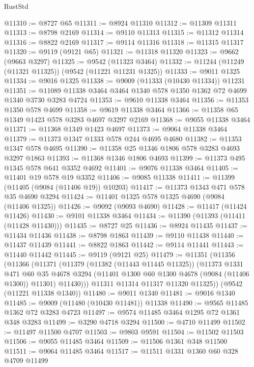 \begin{lexlean}{RustStd}
\begin{coremodule}
@11310 := @8727 @65
@11311 := @8924 @11310
@11312 := @11309 @11311
@11313 := @8798 @2169
@11314 := @9110 @11313
@11315 := @11312 @11314
@11316 := @8822 @2169
@11317 := @9114 @11316
@11318 := @11315 @11317
@11320 := @9119 (@9121 @65)
@11321 := @11318 @11320
@11323 := @9662 (@9663 @3297)
@11325 := @9542 (@11323 @3464)
@11332 := @11244 (@11249 (@11321 @11325)) (@9542 (@11221 @11231 @1325))
@11333 := @9011 @1325
@11334 := @9016 @1325
@11338 := @9009 (@11333 (@10430 @11334)) @11231
@11351 := @11089 @11338 @3464 @3464 @1340 @578 @1350 @1362 @72 @4699 @1340 @3730 @3283 @4724
@11353 := @9610 @11338 @3464
@11356 := @11353 @1350 @578 @4699
@11358 := @9619 @11338 @3464
@11366 := @11358 @65 @1349 @1423 @578 @3283 @4697 @3297 @2169
@11368 := @9055 @11338 @3464
@11371 := @11368 @1349 @1423 @4697
@11373 := @9064 @11338 @3464
@11379 := @11373 @1347 @1333 @578 @244 @4695 @4680
@11382 := @11353 @1347 @578 @4695
@11390 := @11358 @25 @1346 @1806 @578 @3283 @4693 @3297 @1863
@11393 := @11368 @1346 @1806 @4693
@11399 := @11373 @495 @1345 @578 @641 @3352 @4692
@11401 := @9076 @11338 @3464
@11405 := @11401 @19 @578 @19 @3352
@11406 := @9085 @11338
@11411 := @11399 (@11405 (@9084 (@11406 @19)) @10203)
@11417 := @11373 @1343 @471 @578 @35 @4690 @3294
@11424 := @11401 @1325 @578 @1325 @4690 (@9084 (@11406 @1325))
@11426 := @9092 (@9093 @4690)
@11428 := @11417 (@11424 @11426)
@11430 := @9101 @11338 @3464
@11434 := @11390 (@11393 (@11411 (@11428 @11430)))
@11435 := @8727 @25
@11436 := @8924 @11435
@11437 := @11434 @11436
@11438 := @8798 @1863
@11439 := @9110 @11438
@11440 := @11437 @11439
@11441 := @8822 @1863
@11442 := @9114 @11441
@11443 := @11440 @11442
@11445 := @9119 (@9121 @25)
@11479 := @11351
    (@11356
      (@11366
        (@11371
          (@11379
            (@11382 (@11443 @11445 @11325))
            (@11373
              @1331
              @471
              @60
              @35
              @4678
              @3294
              (@11401 @1300 @60 @1300 @4678 (@9084 (@11406 @1300)) @11301)
              @11430)))
        @11311
        @11314
        @11317
        @11320
        @11325))
    (@9542 (@11221 @11338 @1340))
@11480 := @9011 @1340
@11481 := @9016 @1340
@11485 := @9009 (@11480 (@10430 @11481)) @11338
@11490 := @9565 @11485 @1362 @72 @3283 @4723
@11497 := @9574 @11485 @3464 @1295 @72 @1361 @348 @3283
@11499 := @3290 @4718 @3294
@11500 := @4710 @11499
@11502 := @11497 @11500 @4707
@11503 := @9803 @9591
@11504 := @11502 @11503
@11506 := @9055 @11485 @3464
@11509 := @11506 @1361 @348 @11500
@11511 := @9064 @11485 @3464
@11517 := @11511 @1331 @1360 @60 @328 @4709 @11499

\end{coremodule}
\end{lexlean}
